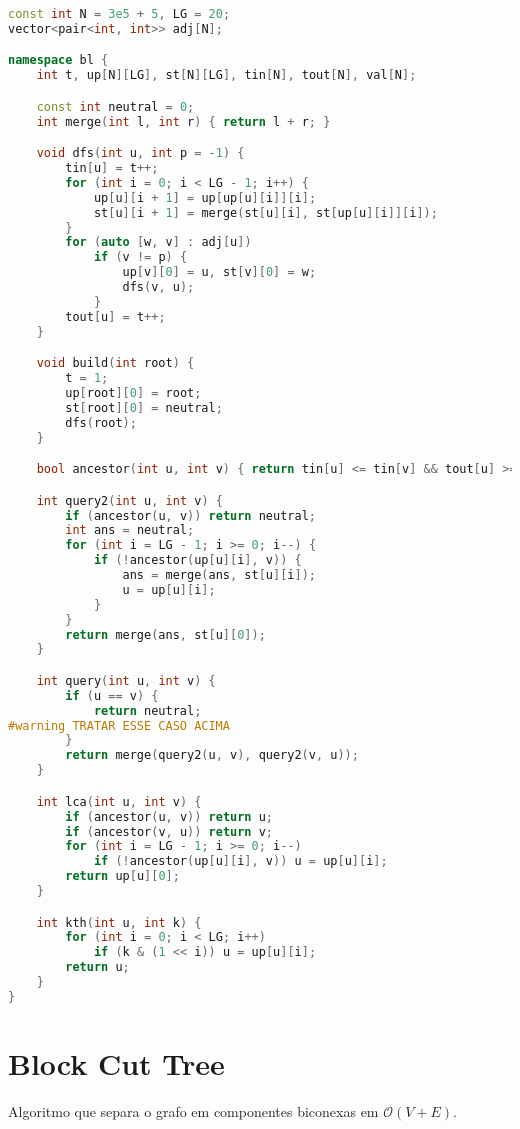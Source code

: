 \documentclass[10pt, a4paper, oneside]{book}
\begin{document}
\begin{lstlisting}[language=C++]
const int N = 3e5 + 5, LG = 20;
vector<pair<int, int>> adj[N];

namespace bl {
    int t, up[N][LG], st[N][LG], tin[N], tout[N], val[N];

    const int neutral = 0;
    int merge(int l, int r) { return l + r; }

    void dfs(int u, int p = -1) {
        tin[u] = t++;
        for (int i = 0; i < LG - 1; i++) {
            up[u][i + 1] = up[up[u][i]][i];
            st[u][i + 1] = merge(st[u][i], st[up[u][i]][i]);
        }
        for (auto [w, v] : adj[u])
            if (v != p) {
                up[v][0] = u, st[v][0] = w;
                dfs(v, u);
            }
        tout[u] = t++;
    }

    void build(int root) {
        t = 1;
        up[root][0] = root;
        st[root][0] = neutral;
        dfs(root);
    }

    bool ancestor(int u, int v) { return tin[u] <= tin[v] && tout[u] >= tout[v]; }

    int query2(int u, int v) {
        if (ancestor(u, v)) return neutral;
        int ans = neutral;
        for (int i = LG - 1; i >= 0; i--) {
            if (!ancestor(up[u][i], v)) {
                ans = merge(ans, st[u][i]);
                u = up[u][i];
            }
        }
        return merge(ans, st[u][0]);
    }

    int query(int u, int v) {
        if (u == v) {
            return neutral;
#warning TRATAR ESSE CASO ACIMA
        }
        return merge(query2(u, v), query2(v, u));
    }

    int lca(int u, int v) {
        if (ancestor(u, v)) return u;
        if (ancestor(v, u)) return v;
        for (int i = LG - 1; i >= 0; i--)
            if (!ancestor(up[u][i], v)) u = up[u][i];
        return up[u][0];
    }

    int kth(int u, int k) {
        for (int i = 0; i < LG; i++)
            if (k & (1 << i)) u = up[u][i];
        return u;
    }
}
\end{lstlisting}
\hfill

\section{Block Cut Tree}


Algoritmo que separa o grafo em componentes biconexas em $\mathcal{O}(V + E)$.
\end{document}
